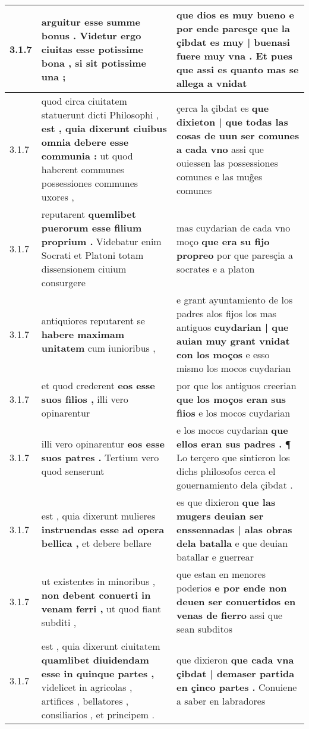 \begin{tabular}{|p{1cm}|p{6.5cm}|p{6.5cm}|}
3.1.7 & arguitur esse summe bonus . \textbf{ Videtur ergo ciuitas esse potissime bona , } si sit potissime una ; & que dios es muy bueno \textbf{ e por ende paresçe que la çibdat es muy | buenasi fuere muy vna . } Et pues que assi es quanto mas se allega a vnidat \\\hline
3.1.7 & quod circa ciuitatem statuerunt dicti Philosophi , \textbf{ est , quia dixerunt ciuibus omnia debere esse communia : } ut quod haberent communes possessiones communes uxores , & çerca la çibdat es \textbf{ que dixieton | que todas las cosas de uun ser comunes a cada vno } assi que ouiessen las possessiones comunes e las mug̃es comunes \\\hline
3.1.7 & reputarent \textbf{ quemlibet puerorum esse filium proprium . } Videbatur enim Socrati et Platoni totam dissensionem ciuium consurgere & mas cuydarian de cada vno moço \textbf{ que era su fijo propreo } por que paresçia a socrates e a platon \\\hline
3.1.7 & antiquiores reputarent se \textbf{ habere maximam unitatem } cum iunioribus , & e grant ayuntamiento de los padres alos fijos los mas antiguos \textbf{ cuydarian | que auian muy grant vnidat con los moços } e esso mismo los mocos cuydarian \\\hline
3.1.7 & et quod crederent \textbf{ eos esse suos filios , } illi vero opinarentur & por que los antiguos creerian \textbf{ que los moços eran sus fiios } e los mocos cuydarian \\\hline
3.1.7 & illi vero opinarentur \textbf{ eos esse suos patres . } Tertium vero quod senserunt & e los mocos cuydarian \textbf{ que ellos eran sus padres . } ¶ Lo terçero que sintieron los dichs philosofos cerca el gouernamiento dela çibdat . \\\hline
3.1.7 & est , quia dixerunt mulieres \textbf{ instruendas esse ad opera bellica , } et debere bellare & es que dixieron \textbf{ que las mugers deuian ser enssennadas | alas obras dela batalla } e que deuian batallar e guerrear \\\hline
3.1.7 & ut existentes in minoribus , \textbf{ non debent conuerti in venam ferri , } ut quod fiant subditi , & que estan en menores poderios \textbf{ e por ende non deuen ser conuertidos en venas de fierro } assi que sean subditos \\\hline
3.1.7 & est , quia dixerunt ciuitatem \textbf{ quamlibet diuidendam esse in quinque partes , } videlicet in agricolas , artifices , bellatores , consiliarios , et principem . & que dixieron \textbf{ que cada vna çibdat | demaser partida en çinco partes . } Conuiene a saber en labradores \\\hline

\end{tabular}
